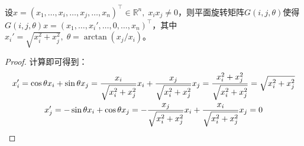 \begin{theorem}[G约化定理]\label{theo:Givens}
	设$x=(x_1,\dots,x_i,\dots,x_j,\dots,x_n)^{\top}\in\mathbb{R}^{n},\;x_ix_j\ne0$，则平面旋转矩阵$G(i,j,\theta)$使得$G(i,j,\theta)x=(x_1,\dots,x_i',\dots,0,\dots,x_n)^{\top}$，其中$x_i'=\sqrt{x_i^2+x_j^2},\;\theta=\arctan(x_j/x_i)$。
\end{theorem}
\begin{proof}
	计算即可得到：
	\begin{gather*}
		x_i'=\cos\theta x_i+\sin\theta x_j=\frac{x_i}{\sqrt{x_i^2+x_j^2}}x_i+\frac{x_j}{\sqrt{x_i^2+x_j^2}}x_j=\frac{x_i^2+x_j^2}{\sqrt{x_i^2+x_j^2}}=\sqrt{x_i^2+x_j^2} \\
		x_j'=-\sin\theta x_i+\cos\theta x_j=-\frac{x_j}{\sqrt{x_i^2+x_j^2}}x_i+\frac{x_i}{\sqrt{x_i^2+x_j^2}}x_j=0\qedhere
	\end{gather*}
\end{proof}

